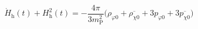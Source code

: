 \begin{equation}                                       \label{3+}
\dot{H}_{\text{h}}(t){+}H_{\text{h}}^{2}(t)=
{-}\frac{4\pi}{3m^{2}_{\text{P}}}\big(\rho_{\varphi
  0}{+}\overline{\rho_{\chi 0}}{+}
3p_{\varphi 0}{+}3\overline{p_{\chi 0}}\big)
\end{equation}

